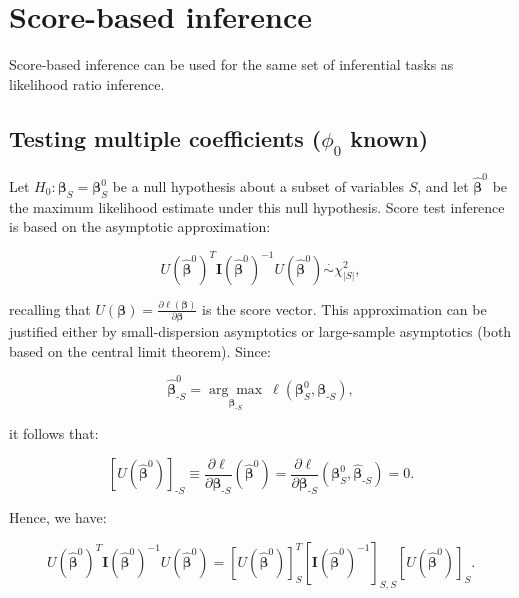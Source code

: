 \documentclass[
  11pt,
  letterpaper,
  oneside]{book}
\theoremstyle{plain}
\theoremstyle{plain}
\theoremstyle{definition}
\theoremstyle{definition}
\theoremstyle{plain}
\theoremstyle{remark}
\begin{document}
\hypertarget{sec-score-inference}{%
\section{Score-based inference}\label{sec-score-inference}}

Score-based inference can be used for the same set of inferential tasks
as likelihood ratio inference.

\hypertarget{sec-score-test-multiple-coeff}{%
\subsection{\texorpdfstring{Testing multiple coefficients (\(\phi_0\)
known)}{Testing multiple coefficients (\textbackslash phi\_0 known)}}\label{sec-score-test-multiple-coeff}}

Let \(H_0: \boldsymbol{\beta}_S = \boldsymbol{\beta}_S^0\) be a null
hypothesis about a subset of variables \(S\), and let
\(\boldsymbol{\widehat{\beta}}^0\) be the maximum likelihood estimate
under this null hypothesis. Score test inference is based on the
asymptotic approximation:

\[
U(\boldsymbol{\widehat{\beta}}^0)^T \boldsymbol{I}(\boldsymbol{\widehat{\beta}}^0)^{-1} U(\boldsymbol{\widehat{\beta}}^0) \overset{\cdot}{\sim} \chi^2_{|S|},
\]

recalling that
\(U(\boldsymbol{\beta}) = \frac{\partial \ell(\boldsymbol{\beta})}{\partial \boldsymbol{\beta}}\)
is the score vector. This approximation can be justified either by
small-dispersion asymptotics or large-sample asymptotics (both based on
the central limit theorem). Since:

\[
\boldsymbol{\widehat{\beta}}^0_{\text{-}S} = \underset{\boldsymbol{\beta}_{\text{-}S}}{\arg \max}\ \ell(\boldsymbol{\beta}^0_{S}, \boldsymbol{\beta}_{\text{-}S}),
\]

it follows that:

\[
[U(\boldsymbol{\widehat{\beta}}^0)]_{\text{-}S} \equiv \frac{\partial \ell}{\partial \boldsymbol{\beta}_{\text{-}S}}(\boldsymbol{\widehat{\beta}}^0) = \frac{\partial \ell}{\partial \boldsymbol{\beta}_{\text{-}S}}(\boldsymbol{\beta}^0_{S}, \boldsymbol{\widehat{\beta}}_{\text{-}S}) = 0.
\]

Hence, we have:

\[
U(\boldsymbol{\widehat{\beta}}^0)^T \boldsymbol{I}(\boldsymbol{\widehat{\beta}}^0)^{-1} U(\boldsymbol{\widehat{\beta}}^0) = [U(\boldsymbol{\widehat{\beta}}^0)]_S^T [\boldsymbol{I}(\boldsymbol{\widehat{\beta}}^0)^{-1}]_{S,S} [U(\boldsymbol{\widehat{\beta}}^0)]_S.
\]
\end{document}
